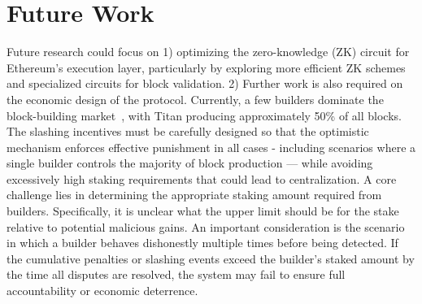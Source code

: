 \section{Future Work}
\label{sec:future_work}
Future research could focus on 1) optimizing the zero-knowledge (ZK) circuit for Ethereum’s execution layer, particularly by exploring more efficient ZK schemes and specialized circuits for block validation.
2) Further work is also required on the economic design of the protocol. Currently, a few builders dominate the block-building market~\cite{relayscan}, with Titan producing approximately 50\% of all blocks.
The slashing incentives must be carefully designed so that the optimistic mechanism enforces effective punishment in all cases - including scenarios where a single builder controls the majority of block production — while avoiding excessively high staking requirements that could lead to centralization.
A core challenge lies in determining the appropriate staking amount required from builders. Specifically, it is unclear what the upper limit should be for the stake relative to potential malicious gains. An important consideration is the scenario in which a builder behaves dishonestly multiple times before being detected. If the cumulative penalties or slashing events exceed the builder’s staked amount by the time all disputes are resolved, the system may fail to ensure full accountability or economic deterrence.
